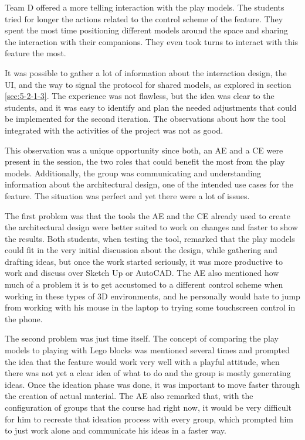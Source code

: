 Team D offered a more telling interaction with the play models. The students tried for longer the actions related to the control scheme of the feature. They spent the most
time positioning different models around the space and sharing the interaction with their companions. They even took turns to interact with this feature the most.

It was possible to gather a lot of information about the interaction design, the UI, and the way to signal the protocol for shared models, as explored in section \ref{sec:5-2-1-3}.
The experience was not flawless, but the idea was clear to the students, and it was easy to identify and plan the needed adjustments that could be implemented for the
second iteration. The observations about how the tool integrated with the activities of the project was not as good.

This observation was a unique opportunity since both, an \ac{AE} and a \ac{CE} were present in the session, the two roles that could benefit the most from the play models.
Additionally, the group was communicating and understanding information about the architectural design, one of the intended use cases for the feature. The situation was
perfect and yet there were a lot of issues.

The first problem was that the tools the \ac{AE} and the \ac{CE} already used to create the architectural design were better suited to work on changes and faster to show
the results. Both students, when testing the tool, remarked that the play models could fit in the very initial discussion about the design, while gathering and drafting
ideas, but once the work started seriously, it was more productive to work and discuss over Sketch Up or AutoCAD. The \ac{AE} also mentioned how much of a problem it is to
get accustomed to a different control scheme when working in these types of 3D environments, and he personally would hate to jump from working with his mouse in the laptop
to trying some touchscreen control in the phone.

The second problem was just time itself. The concept of comparing the play models to playing with Lego blocks was mentioned several times and prompted the idea that the
feature would work very well with a playful attitude, when there was not yet a clear idea of what to do and the group is mostly generating ideas. Once the ideation phase
was done, it was important to move faster through the creation of actual material. The \ac{AE} also remarked that, with the configuration of groups that the course had
right now, it would be very difficult for him to recreate that ideation process with every group, which prompted him to just work alone and communicate his ideas in a
faster way.

